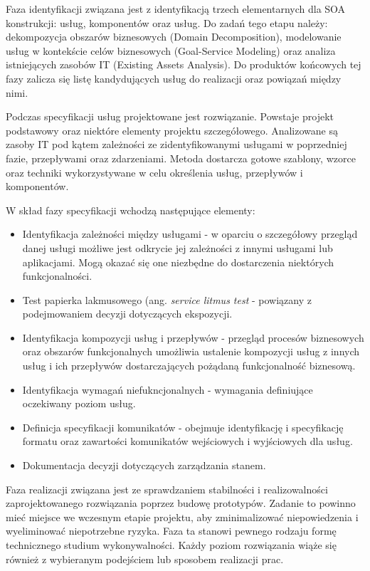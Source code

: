 Faza identyfikacji związana jest z identyfikacją trzech elementarnych dla SOA konstrukcji: usług, komponentów oraz usług. \cite{PlatIntGor} Do zadań tego etapu należy: dekompozycja obszarów biznesowych (Domain Decomposition), modelowanie usług w kontekście celów biznesowych (Goal-Service Modeling) oraz analiza istniejących zasobów IT (Existing Assets Analysis). \cite{SOMAibmRosSuda} Do produktów końcowych tej fazy zalicza się listę kandydujących usług do realizacji oraz powiązań między nimi. \cite{PlatIntGor}

Podczas specyfikacji usług projektowane jest rozwiązanie. Powstaje projekt podstawowy oraz niektóre elementy projektu szczegółowego. Analizowane są zasoby IT pod kątem zależności ze zidentyfikowanymi usługami w poprzedniej fazie, przepływami oraz zdarzeniami. Metoda dostarcza gotowe szablony, wzorce oraz techniki wykorzystywane w celu określenia usług, przepływów i komponentów. 

W skład fazy specyfikacji wchodzą następujące elementy:
\begin{itemize}
\item{Identyfikacja zależności między usługami - w oparciu o szczegółowy przegląd danej usługi możliwe jest odkrycie jej zależności z innymi usługami lub aplikacjami. Mogą okazać się one niezbędne do dostarczenia niektórych funkcjonalności.}
\item{Test papierka lakmusowego (ang. \textit{service litmus test} - powiązany z podejmowaniem decyzji dotyczących ekspozycji.}
\item{Identyfikacja kompozycji usług i przepływów - przegląd procesów biznesowych oraz obszarów funkcjonalnych umożliwia ustalenie kompozycji usług z innych usług i ich przepływów dostarczających pożądaną funkcjonalność biznesową.}
\item{Identyfikacja wymagań niefukncjonalnych - wymagania definiujące oczekiwany poziom usług.}
\item{Definicja specyfikacji komunikatów - obejmuje identyfikację i specyfikację formatu oraz zawartości komunikatów wejściowych i wyjściowych dla usług.}
\item{Dokumentacja decyzji dotyczących zarządzania stanem.}
\end{itemize}

Faza realizacji związana jest ze sprawdzaniem stabilności i realizowalności zaprojektowanego rozwiązania poprzez budowę prototypów. Zadanie to powinno mieć miejsce we wczesnym etapie projektu, aby zminimalizować niepowiedzenia i wyeliminować niepotrzebne ryzyka. Faza ta stanowi pewnego rodzaju formę technicznego studium wykonywalności. Każdy poziom rozwiązania wiąże się również z wybieranym podejściem lub sposobem realizacji prac.

